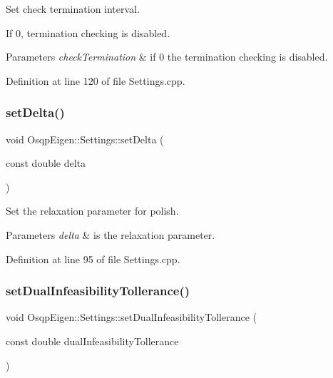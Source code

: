 Set check termination interval. 

If 0, termination checking is disabled. 
\begin{DoxyParams}{Parameters}
{\em check\+Termination} & if 0 the termination checking is disabled. \\
\hline
\end{DoxyParams}


Definition at line 120 of file Settings.\+cpp.

\mbox{\label{classOsqpEigen_1_1Settings_a7a3e8d416f71d7fc572482d24a9a8ba2}} 
\subsubsection{\texorpdfstring{set\+Delta()}{setDelta()}}
{\footnotesize\ttfamily void Osqp\+Eigen\+::\+Settings\+::set\+Delta (\begin{DoxyParamCaption}\item[{const double}]{delta }\end{DoxyParamCaption})}



Set the relaxation parameter for polish. 


\begin{DoxyParams}{Parameters}
{\em delta} & is the relaxation parameter. \\
\hline
\end{DoxyParams}


Definition at line 95 of file Settings.\+cpp.

\mbox{\label{classOsqpEigen_1_1Settings_a466e7884ef5dfe331f4c1fdc3382d7bb}} 
\subsubsection{\texorpdfstring{set\+Dual\+Infeasibility\+Tollerance()}{setDualInfeasibilityTollerance()}}
{\footnotesize\ttfamily void Osqp\+Eigen\+::\+Settings\+::set\+Dual\+Infeasibility\+Tollerance (\begin{DoxyParamCaption}\item[{const double}]{dual\+Infeasibility\+Tollerance }\end{DoxyParamCaption})}



